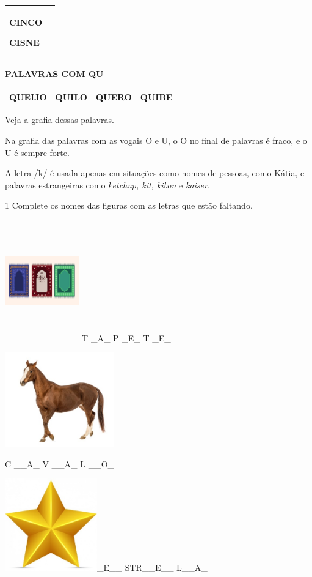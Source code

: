 {\begin{longtable}[]{@{}ll@{}}
\begin{minipage}[t]{0.48\columnwidth}
\textbf{CINCO}

\textbf{CISNE}\strut
\end{minipage}\tabularnewline
\bottomrule
\end{longtable}

\textbf{PALAVRAS COM QU}

\begin{longtable}[]{@{}llll@{}}
\toprule
\textbf{QUEIJO} & \textbf{QUILO} & \textbf{QUERO} &
\textbf{QUIBE}\tabularnewline
\bottomrule
\end{longtable}

Veja a grafia dessas palavras.

Na grafia das palavras com as vogais O e U, o O no final de palavras é
fraco, e o U é sempre forte.


A letra /k/ é usada apenas em situações como nomes de
pessoas, como Kátia, e palavras estrangeiras como
\textit{ketchup, kit, kibon} e \textit{kaiser}.
}


\num{1} Complete os nomes das figuras com as letras que estão faltando.

\includegraphics[width=1.26518in,height=2.06178in]{media/image1.jpeg} T
\_A\_ P \_E\_ T \_E\_

\includegraphics[width=1.85417in,height=1.60240in]{media/image2.jpeg}

C \_\_A\_ V \_\_A\_ L \_\_O\_

\includegraphics[width=1.57292in,height=1.57292in]{media/image3.jpeg}\_E\_\_
STR\_\_E\_\_ L\_\_A\_

